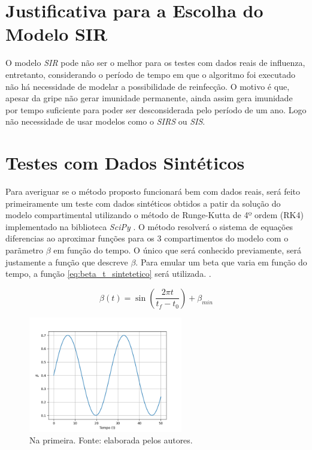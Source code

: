 \section{Justificativa para a Escolha do Modelo SIR}

O modelo \textit{SIR} pode não ser o melhor para os testes com dados reais de influenza,
entretanto, considerando o período de tempo em que o algoritmo foi executado não há 
necessidade de modelar a possibilidade de reinfecção. O motivo é que, apesar da gripe 
não gerar imunidade permanente, ainda assim gera imunidade por tempo suficiente
para poder ser desconsiderada pelo período de um ano. Logo não necessidade de usar
modelos como o \textit{SIRS} ou \textit{SIS}.  

\section{Testes com Dados Sintéticos}

Para averiguar se o método proposto funcionará bem com dados reais,
será feito primeiramente um teste com dados sintéticos obtidos a patir da solução
do modelo compartimental utilizando o método de Runge-Kutta de 4º ordem (RK4)
implementado na biblioteca \textit{SciPy} \cite{scipy}. O método resolverá 
o sistema de equações diferencias ao aproximar funções para os 3 compartimentos
do modelo  com o parãmetro $\beta$ em função do tempo. O único que 
será conhecido previamente, será justamente a função que descreve $\beta$.
Para emular um beta que varia em função do tempo, 
a função \ref{eq:beta_t_sintetetico} será utilizada.
\cite{andreu-vilarroig-etal:2025-sugestao-beta-t}
\cite{edlnd-etal:2011-sugestao-beta-t}.

\begin{equation} \label{eq:beta_t_sintetetico}
    \beta(t) = \sin(\frac{2\pi t}{t_f - t_0})  + \beta_{min}
\end{equation}

\begin{figure}[htpb]
\centering
\includegraphics[width=0.6\textwidth]{figuras/real-beta-sir-nonoise.png}
\caption{Na primeira. Fonte: elaborada pelos autores.}
\label{fig:beta-sir-semruido}
\end{figure}

